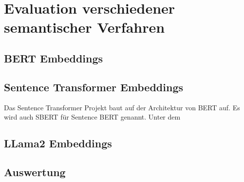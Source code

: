 \chapter{Evaluation verschiedener semantischer Verfahren}\label{ch:experiments}


\section{BERT Embeddings}



\section{Sentence Transformer Embeddings}

Das Sentence Transformer Projekt baut auf der Architektur von BERT auf. 
Es wird auch SBERT für Sentence BERT genannt. 
Unter dem 

\section{LLama2 Embeddings}

\section{Auswertung}